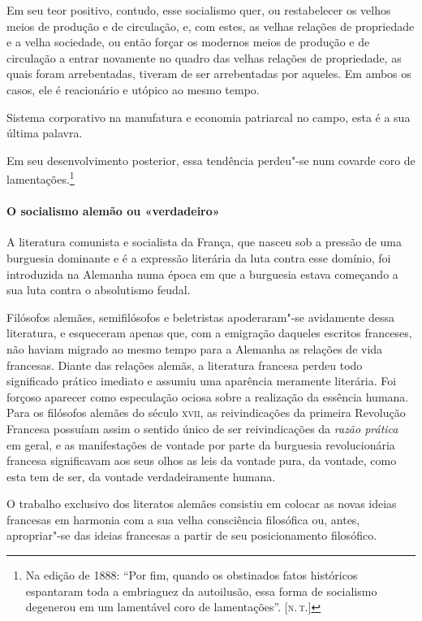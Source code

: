 Em seu teor positivo, contudo, esse socialismo quer, ou restabelecer os
velhos meios de produção e de circulação, e, com estes, as velhas
relações de propriedade e a velha sociedade, ou então forçar os
modernos meios de produção e de circulação a entrar novamente no quadro
das velhas relações de propriedade, as quais foram arrebentadas,
tiveram de ser arrebentadas por aqueles. Em ambos os casos, ele é
reacionário e utópico ao mesmo tempo.

Sistema corporativo na manufatura e economia patriarcal no campo, esta é
a sua última palavra.

Em seu desenvolvimento posterior, essa tendência perdeu"-se num
covarde coro de lamentações.\footnote{Na edição de 1888: ``Por fim, quando os obstinados fatos históricos espantaram toda a embriaguez da autoilusão, essa forma de
socialismo degenerou em um lamentável coro de lamentações''. [\textsc{n.\,t.}]}

\paragraph{O socialismo alemão ou «verdadeiro»}

A literatura comunista e socialista da França, que nasceu sob a pressão
de uma burguesia dominante e é a expressão literária da luta contra
esse domínio, foi introduzida na Alemanha numa época em que a burguesia
estava começando a sua luta contra o absolutismo feudal.

Filósofos alemães, semifilósofos e beletristas apoderaram"-se
avidamente dessa literatura, e esqueceram apenas que, com a emigração
daqueles escritos franceses, não haviam migrado ao mesmo tempo para a
Alemanha as relações de vida francesas. Diante das relações alemãs, a
literatura francesa perdeu todo significado prático imediato e assumiu
uma aparência meramente literária. Foi forçoso aparecer como
especulação ociosa sobre a realização da essência humana. Para os
filósofos alemães do século \textsc{xvii}, as reivindicações da primeira
Revolução Francesa possuíam assim o sentido único de ser reivindicações
da \textit{razão prática} em geral, e as manifestações de vontade por parte da
burguesia revolucionária francesa significavam aos seus olhos as leis
da vontade pura, da vontade, como esta tem de ser, da vontade
verdadeiramente humana.

O trabalho exclusivo dos literatos alemães consistiu em colocar as novas
ideias francesas em harmonia com a sua velha consciência filosófica ou,
antes, apropriar"-se das ideias francesas a partir de seu
posicionamento filosófico.

